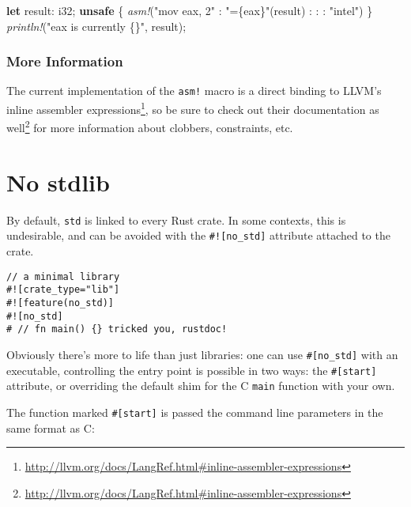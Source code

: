 \documentclass[a4paper,]{book}
\newenvironment{Shaded}{\begin{snugshade}}{\end{snugshade}}
\newcommand{\KeywordTok}[1]{\textcolor[rgb]{0.13,0.29,0.53}{\textbf{{#1}}}}
\newcommand{\DataTypeTok}[1]{\textcolor[rgb]{0.13,0.29,0.53}{{#1}}}
\newcommand{\StringTok}[1]{\textcolor[rgb]{0.31,0.60,0.02}{{#1}}}
\newcommand{\PreprocessorTok}[1]{\textcolor[rgb]{0.56,0.35,0.01}{\textit{{#1}}}}
\newcommand{\NormalTok}[1]{{#1}}
\renewcommand{\href}[2]{#2\footnote{\url{#1}}}
\begin{document}
\begin{Shaded}
\begin{Highlighting}[]
\KeywordTok{let} \NormalTok{result: }\DataTypeTok{i32}\NormalTok{;}
\KeywordTok{unsafe} \NormalTok{\{}
   \PreprocessorTok{asm!}\NormalTok{(}\StringTok{"mov eax, 2"} \NormalTok{: }\StringTok{"=\{eax\}"}\NormalTok{(result) : : : }\StringTok{"intel"}\NormalTok{)}
\NormalTok{\}}
\PreprocessorTok{println!}\NormalTok{(}\StringTok{"eax is currently \{\}"}\NormalTok{, result);}
\end{Highlighting}
\end{Shaded}

\subsubsection{More Information}\label{more-information}

The current implementation of the \texttt{asm!} macro is a direct
binding to
\href{http://llvm.org/docs/LangRef.html\#inline-assembler-expressions}{LLVM's
inline assembler expressions}, so be sure to check out
\href{http://llvm.org/docs/LangRef.html\#inline-assembler-expressions}{their
documentation as well} for more information about clobbers, constraints,
etc.

\section{No stdlib}\label{sec--no-stdlib}

By default, \texttt{std} is linked to every Rust crate. In some
contexts, this is undesirable, and can be avoided with the
\texttt{\#!{[}no\_std{]}} attribute attached to the crate.

\begin{verbatim}
// a minimal library
#![crate_type="lib"]
#![feature(no_std)]
#![no_std]
# // fn main() {} tricked you, rustdoc!
\end{verbatim}

Obviously there's more to life than just libraries: one can use
\texttt{\#{[}no\_std{]}} with an executable, controlling the entry point
is possible in two ways: the \texttt{\#{[}start{]}} attribute, or
overriding the default shim for the C \texttt{main} function with your
own.

The function marked \texttt{\#{[}start{]}} is passed the command line
parameters in the same format as C:
\end{document}
